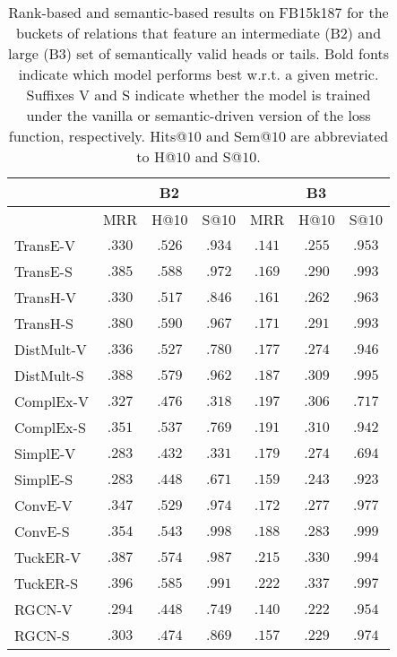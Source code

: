 \documentclass[letterpaper]{article} %
\begin{document}
\begin{table*}[h]
    \caption{Rank-based and semantic-based results on FB15k187 for the buckets of relations that feature an intermediate (B2) and large (B3) set of semantically valid heads or tails. Bold fonts indicate which model performs best w.r.t. a given metric. Suffixes V and S indicate whether the model is trained under the vanilla or semantic-driven version of the loss function, respectively. Hits@$10$ and Sem@$10$ are abbreviated to H@$10$ and S@$10$.}
    \setlength{\tabcolsep}{.25cm}
    \centering
    \small
    \begin{tabular}{lcccccc}    
    \hline
    &\multicolumn{3}{c}{B2} & \multicolumn{3}{c}{B3}
                    \\\hline
                    & MRR & H@10 & S@10 &
                    MRR & H@10 & S@10 \\
\hline
				TransE-V&$.330$&$.526$&$.934$&$.141$&$.255$&$.953$\\
                    TransE-S &$\mathbf{.385}$&$\mathbf{.588}$&$\mathbf{.972}$&$\mathbf{.169}$&$\mathbf{.290}$&$\mathbf{.993}$ \\
    \hline
                    TransH-V &$.330$&$.517$&$.846$&$.161$&$.262$&$.963$ \\
                    TransH-S &$\mathbf{.380}$&$\mathbf{.590}$&$\mathbf{.967}$&$\mathbf{.171}$&$\mathbf{.291}$&$\mathbf{.993}$ \\
    \hline
                    DistMult-V &$.336$&$.527$&$.780$&$.177$&$.274$&$.946$ \\
				DistMult-S &$\mathbf{.388}$&$\mathbf{.579}$&$\mathbf{.962}$&$\mathbf{.187}$&$\mathbf{.309}$&$\mathbf{.995}$ \\
    \hline
    ComplEx-V &$.327$&$.476$&$.318$&$\mathbf{.197}$&$.306$&$.717$ \\
    			ComplEx-S &$\mathbf{.351}$&$\mathbf{.537}$&$\mathbf{.769}$&$.191$&$\mathbf{.310}$&$\mathbf{.942}$ \\
    \hline
                    SimplE-V &$.283$&$.432$&$.331$&$\mathbf{.179}$&$\mathbf{.274}$&$.694$ \\
                    SimplE-S &$.283$&$\mathbf{.448}$&$\mathbf{.671}$&$.159$&$.243$&$\mathbf{.923}$ \\
    \hline
				ConvE-V &$.347$&$.529$&$.974$&$.172$&$.277$&$.977$ \\
				ConvE-S&$\mathbf{.354}$&$\mathbf{.543}$&$\mathbf{.998}$&$\mathbf{.188}$&$\mathbf{.283}$&$\mathbf{.999}$  \\
    \hline
    			TuckER-V &$.387$&$.574$&$.987$&$.215$&$.330$&$.994$ \\
                   TuckER-S &$\mathbf{.396}$&$\mathbf{.585}$&$\mathbf{.991}$&$\mathbf{.222}$&$\mathbf{.337}$&$\mathbf{.997}$ \\
    \hline
                    RGCN-V &$.294$&$.448$&$.749$&$.140$&$.222$&$.954$ \\
                    RGCN-S &$\mathbf{.303}$&$\mathbf{.474}$&$\mathbf{.869}$&$\mathbf{.157}$&$\mathbf{.229}$&$\mathbf{.974}$ \\
    \hline
    \end{tabular}
    \label{tab:fb}
\end{table*}
\end{document}
